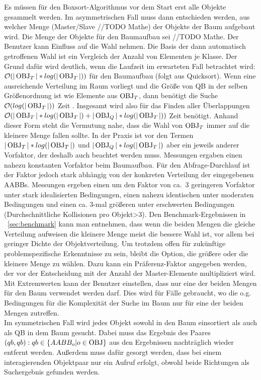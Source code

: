 Es müssen für den Boxsort-Algorithmus vor dem Start erst alle Objekte gesammelt werden. Im asymmetrischen Fall muss dann entschieden werden, aus welcher Menge (Master/Slave //TODO Mathe) der Objekte der Baum aufgebaut wird. Die Menge der Objekte für den Baumaufbau sei //TODO Mathe. Der Benutzer kann Einfluss auf die Wahl nehmen. Die Basis der dann automatisch getroffenen Wahl ist ein Vergleich der Anzahl von Elementen je Klasse. Der Grund dafür wird deutlich, wenn die Laufzeit im erwarteten Fall betrachtet wird: $\mathcal{O}(|\operatorname{OBJ}_T|*log(|\operatorname{OBJ}_T|))$ für den Baumaufbau (folgt aus Quicksort). Wenn eine ausreichende Verteilung im Raum vorliegt und die Größe von QB in der selben Größenordnung ist wie Elemente aus $\operatorname{OBJ}_T$, dann benötigt die Suche $\mathcal{O}(log(|\operatorname{OBJ}_T|))$ Zeit \cite[//TODO Abstract; überhaupt angeben?]{houthuys1987box}. Insgesamt wird also für das Finden aller Überlappungen $\mathcal{O}(|\operatorname{OBJ}_T|*log(|\operatorname{OBJ}_T|)+|\operatorname{OBJ}_Q|*log(|\operatorname{OBJ}_T|))$ Zeit benötigt. Anhand dieser Form steht die Vermutung nahe, dass die Wahl von $\operatorname{OBJ}_T$ immer auf die kleinere Menge fallen sollte. In der Praxis ist vor den Termen $|\operatorname{OBJ}_T|*log(|\operatorname{OBJ}_T|)$ und $|\operatorname{OBJ}_Q|*log(|\operatorname{OBJ}_T|)$ aber ein jeweils anderer Vorfaktor, der deshalb auch beachtet werden muss. Messungen ergaben einen nahezu konstanten Vorfaktor beim Baumaufbau. Für den Abfrage-Durchlauf  ist der Faktor jedoch stark abhängig von der konkreten Verteilung der eingegebenen AABBs. Messungen ergeben einen um den Faktor von ca.~3 geringeren Vorfaktor unter stark idealisierten Bedingungen, einen nahezu identischen unter moderaten Bedingungen und einen ca. 3-mal größeren unter erschwerten Bedingungen (Durchschnittliche Kollisionen pro Objekt>3). Den Benchmark-Ergebnissen in ~\ref{sec:benchmark} kann man entnehmen, dass wenn die beiden Mengen die gleiche Verteilung aufweisen die kleinere Menge meist die bessere Wahl ist, vor allem bei geringer Dichte der Objektverteilung. Um trotzdem offen für zukünftige problemspezifische Erkenntnisse zu sein, bleibt die Option, die größere oder die kleinere Menge zu wählen. Dazu kann ein Präferenz-Faktor angegeben werden, der vor der Entscheidung mit der Anzahl der Master-Elemente multipliziert wird. Mit Extremwerten kann der Benutzer einstellen, dass nur eine der beiden Mengen für den Baum verwendet werden darf. Dies wird für Fälle gebraucht, wo die o.g. Bedingungen für die Komplexität der Suche im Baum nur für eine der beiden Mengen zutreffen.\\
 
 
Im symmetrischen Fall wird jedes Objekt sowohl in den Baum einsortiert als auch als QB in dem Baum gesucht. Dabei muss das Ergebnis des Paares $(qb, qb) : qb\in\{AABB_o | o \in \operatorname{OBJ}\}$ aus den Ergebnissen nachträglich wieder entfernt werden. Außerdem muss dafür gesorgt werden, dass bei einem interagierenden Objektpaar nur ein Aufruf erfolgt, obwohl beide Richtungen als Suchergebnis gefunden werden.\\

